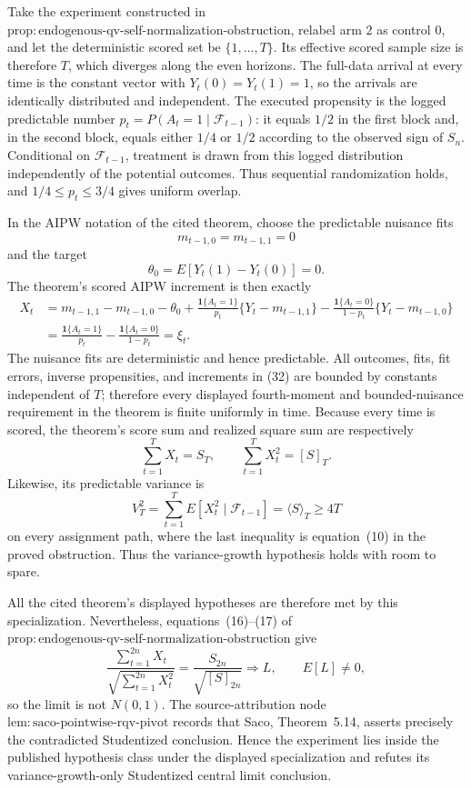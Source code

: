 Take the experiment constructed in \(\mathrm{prop:endogenous\text{-}qv\text{-}self\text{-}normalization\text{-}obstruction}\), relabel arm \(2\) as control \(0\), and let the deterministic scored set be \(\{1,\ldots,T\}\). Its effective scored sample size is therefore \(T\), which diverges along the even horizons. The full-data arrival at every time is the constant vector with \(Y_t(0)=Y_t(1)=1\), so the arrivals are identically distributed and independent. The executed propensity is the logged predictable number \(p_t=P(A_t=1\mid\mathcal F_{t-1})\): it equals \(1/2\) in the first block and, in the second block, equals either \(1/4\) or \(1/2\) according to the observed sign of \(S_n\). Conditional on \(\mathcal F_{t-1}\), treatment is drawn from this logged distribution independently of the potential outcomes. Thus sequential randomization holds, and \(1/4\le p_t\le3/4\) gives uniform overlap.

In the AIPW notation of the cited theorem, choose the predictable nuisance fits
\[
 m_{t-1,0}=m_{t-1,1}=0
\]
and the target
\[
 \theta_0=E[Y_t(1)-Y_t(0)]=0.
\]
The theorem's scored AIPW increment is then exactly
\[
 \begin{aligned}
 X_t
 &=m_{t-1,1}-m_{t-1,0}-\theta_0
   +\frac{\mathbf1\{A_t=1\}}{p_t}\{Y_t-m_{t-1,1}\}
   -\frac{\mathbf1\{A_t=0\}}{1-p_t}\{Y_t-m_{t-1,0}\}\\
 &=\frac{\mathbf1\{A_t=1\}}{p_t}
   -\frac{\mathbf1\{A_t=0\}}{1-p_t}
 =\xi_t.
 \end{aligned}
\tag{32}
\]
The nuisance fits are deterministic and hence predictable. All outcomes, fits, fit errors, inverse propensities, and increments in (32) are bounded by constants independent of \(T\); therefore every displayed fourth-moment and bounded-nuisance requirement in the theorem is finite uniformly in time. Because every time is scored, the theorem's score sum and realized square sum are respectively
\[
 \sum_{t=1}^T X_t=S_T,
 \qquad
 \sum_{t=1}^T X_t^2=[S]_T.
\tag{33}
\]
Likewise, its predictable variance is
\[
 V_T^2=\sum_{t=1}^T E[X_t^2\mid\mathcal F_{t-1}]
       =\langle S\rangle_T\ge4T
\tag{34}
\]
on every assignment path, where the last inequality is equation~(10) in the proved obstruction. Thus the variance-growth hypothesis holds with room to spare.

All the cited theorem's displayed hypotheses are therefore met by this specialization. Nevertheless, equations~(16)--(17) of \(\mathrm{prop:endogenous\text{-}qv\text{-}self\text{-}normalization\text{-}obstruction}\) give
\[
 \frac{\sum_{t=1}^{2n}X_t}{\sqrt{\sum_{t=1}^{2n}X_t^2}}
 =\frac{S_{2n}}{\sqrt{[S]_{2n}}}
 \Longrightarrow L,
 \qquad
 E[L]\ne0,
\tag{35}
\]
so the limit is not \(N(0,1)\). The source-attribution node \(\mathrm{lem:saco\text{-}pointwise\text{-}rqv\text{-}pivot}\) records that Saco, Theorem~5.14, asserts precisely the contradicted Studentized conclusion. Hence the experiment lies inside the published hypothesis class under the displayed specialization and refutes its variance-growth-only Studentized central limit conclusion.